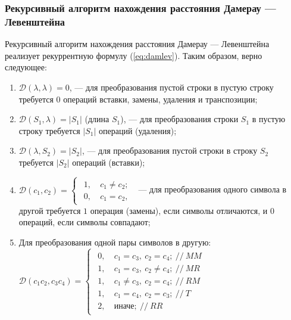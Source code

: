 \subsubsection{Рекурсивный алгоритм нахождения расстояния Дамерау --- Левенштейна}

Рекурсивный алгоритм нахождения расстояния Дамерау --- Левенштейна реализует рекуррентную формулу (\ref{eq:damlev}). Таким образом, верно следующее:
\begin{enumerate}
    \item $\mathcal{D}(\lambda, \lambda) = 0$, --- для преобразования пустой строки в пустую строку требуется $0$ операций вставки, замены, удаления и транспозиции;
    \item $\mathcal{D}(S_1, \lambda) = |S_1|$ (длина $S_1$), --- для преобразования строки $S_1$ в пустую строку требуется $|S_1|$ операций (удаления);
    \item $\mathcal{D}(\lambda, S_2) = |S_2|$, --- для преобразования пустой строки в строку $S_2$ требуется $|S_2|$ операций (вставки);
    \item $\mathcal{D}(c_1, c_2) = \begin{cases}
            \begin{aligned}
                1,\ &c_1 \neq c_2; \\
                0,\ &c_1 = c_2,
            \end{aligned}
    \end{cases} $ --- для преобразования одного символа в другой требуется $1$ операция (замены), если символы отличаются, и $0$ операций, если символы совпадают;
    \item Для преобразования одной пары символов в другую: \\
        $\mathcal{D}(c_1c_2, c_3c_4) = \begin{cases}
            \begin{aligned}
                0,\ &c_1 = c_3,\ c_2 = c_4;\ //\ MM \\
                1,\ &c_1 = c_3,\ c_2 \neq c_4;\ //\ MR \\
                1,\ &c_1 \neq c_3,\ c_2 = c_4;\ //\ RM \\
                1,\ &c_1 = c_4,\ c_2 = c_3;\ //\ T \\
                2,\ &\text{иначе};\ //\ RR
            \end{aligned}
        \end{cases} $

\end{enumerate}
